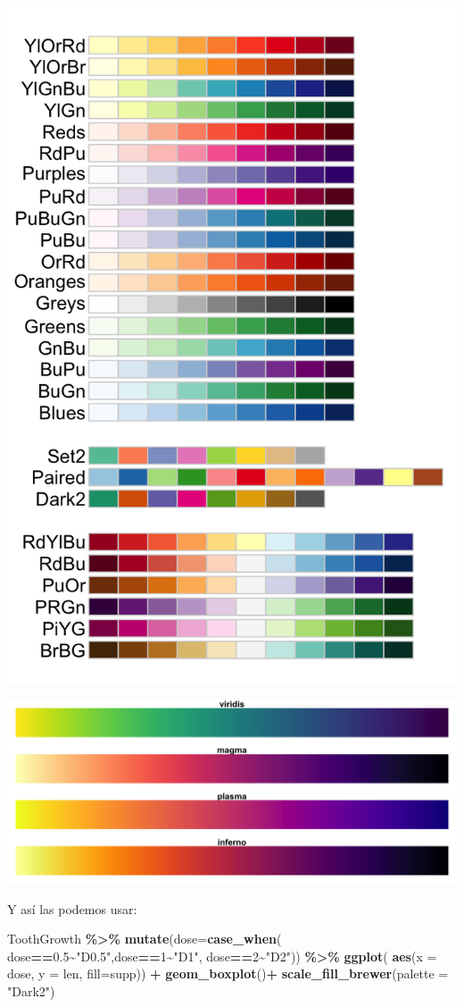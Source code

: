\documentclass[
]{book}
\newenvironment{Shaded}{\begin{snugshade}}{\end{snugshade}}
\newcommand{\AttributeTok}[1]{\textcolor[rgb]{0.13,0.29,0.53}{#1}}
\newcommand{\DecValTok}[1]{\textcolor[rgb]{0.00,0.00,0.81}{#1}}
\newcommand{\FloatTok}[1]{\textcolor[rgb]{0.00,0.00,0.81}{#1}}
\newcommand{\FunctionTok}[1]{\textcolor[rgb]{0.13,0.29,0.53}{\textbf{#1}}}
\newcommand{\NormalTok}[1]{#1}
\newcommand{\SpecialCharTok}[1]{\textcolor[rgb]{0.81,0.36,0.00}{\textbf{#1}}}
\newcommand{\StringTok}[1]{\textcolor[rgb]{0.31,0.60,0.02}{#1}}
\begin{document}
\begin{center}\includegraphics[width=0.5\linewidth]{images//rcolor} \end{center}

\begin{center}\includegraphics[width=0.5\linewidth]{images//viridis} \end{center}

\hfill\break
Y así las podemos usar:\\

\begin{Shaded}
\begin{Highlighting}[]
\NormalTok{ToothGrowth }\SpecialCharTok{\%\textgreater{}\%}  \FunctionTok{mutate}\NormalTok{(}\AttributeTok{dose=}\FunctionTok{case\_when}\NormalTok{(}
\NormalTok{  dose}\SpecialCharTok{==}\FloatTok{0.5}\SpecialCharTok{\textasciitilde{}}\StringTok{"D0.5"}\NormalTok{,dose}\SpecialCharTok{==}\DecValTok{1}\SpecialCharTok{\textasciitilde{}}\StringTok{"D1"}\NormalTok{, dose}\SpecialCharTok{==}\DecValTok{2}\SpecialCharTok{\textasciitilde{}}\StringTok{"D2"}\NormalTok{)) }\SpecialCharTok{\%\textgreater{}\%} \FunctionTok{ggplot}\NormalTok{(}
    \FunctionTok{aes}\NormalTok{(}\AttributeTok{x =}\NormalTok{ dose, }\AttributeTok{y =}\NormalTok{ len, }\AttributeTok{fill=}\NormalTok{supp)) }\SpecialCharTok{+}  \FunctionTok{geom\_boxplot}\NormalTok{()}\SpecialCharTok{+}
  \FunctionTok{scale\_fill\_brewer}\NormalTok{(}\AttributeTok{palette =} \StringTok{"Dark2"}\NormalTok{)}
\end{Highlighting}
\end{Shaded}
\end{document}
